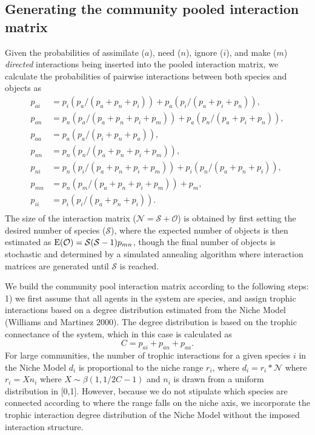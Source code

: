 \documentclass[twocolumn,preprintnumbers,amsmath,amssymb,superscriptaddress]{revtex4}
\begin{document}
\subsection{Generating the community pooled interaction matrix}
Given the probabilities of assimilate ($a$), need ($n$), ignore ($i$), and make ($m$) \emph{directed} interactions being inserted into the pooled interaction matrix, we calculate the probabilities of pairwise interactions between both species and objects as 
\begin{align}
  p_{ai} &= p_i(p_a/(p_a+p_n+p_i)) + p_a(p_i/(p_a+p_i+p_n)), \\ \nonumber
  p_{an} &= p_n(p_a/(p_a+p_n+p_i+p_m)) + p_a(p_n/(p_a+p_i+p_n)), \\ \nonumber
  p_{aa} &= p_a(p_a/(p_i+p_n+p_a)), \\ \nonumber
  p_{nn} &= p_n(p_n/(p_a+p_n+p_i+p_m)), \\ \nonumber
  p_{ni} &= p_n(p_i/(p_a+p_n+p_i+p_m)) + p_i(p_n/(p_a+p_n+p_i)), \\ \nonumber
  p_{mn} &= p_n(p_m/(p_a+p_n+p_i+p_m)) + p_m, \\ \nonumber
  p_{ii} &= p_i(p_i/(p_a+p_n+p_i)).\\ \nonumber
\end{align}
The size of the interaction matrix ($\mathcal{N} = \mathcal{S} + \mathcal{O}$) is obtained by first setting the desired number of species ($\mathcal{S}$), where the expected number of objects is then estimated as ${\rm E}(\mathcal{O}) = \mathcal{S}(\mathcal{S}-1)p_{mn}$, though the final number of objects is stochastic and determined by a simulated annealing algorithm where interaction matrices are generated until $\mathcal{S}$ is reached.

We build the community pool interaction matrix according to the following steps:
1) we first assume that all agents in the system are species, and assign trophic interactions based on a degree distribution estimated from the Niche Model (Williams and Martinez 2000).
The degree distribution is based on the trophic connectance of the system, which in this case is calculated as 
\begin{equation}
  C = p_{ai}+p_{an}+p_{aa}.
\end{equation}
For large communities, the number of trophic interactions for a given species $i$ in the Niche Model $d_i$ is proportional to the niche range $r_i$, where $d_i = r_i*\mathcal{N}$ where $r_i = Xn_i$ where $X \sim \beta(1,1/2C - 1)$ and $n_i$ is drawn from a uniform distribution in [0,1].
However, because we do not stipulate which species are connected according to where the range falls on the niche axis, we incorporate the trophic interaction degree distribution of the Niche Model without the imposed interaction structure.
\end{document}
